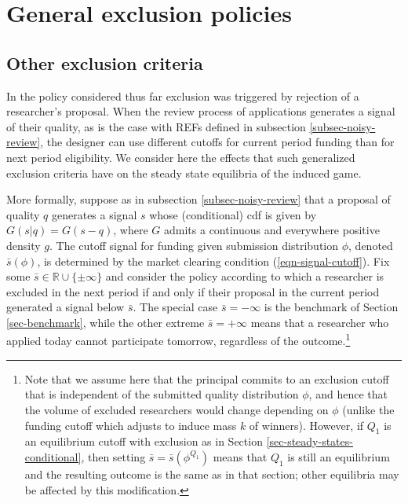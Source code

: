 \documentclass[12pt]{article}
\theoremstyle{plain}
\theoremstyle{definition}
\theoremstyle{remark}
\def\RR{\mathbb{R}}
\begin{document}
\section{General exclusion policies}\label{sec-generalized}


\subsection{Other exclusion criteria}\label{subsec-other-criteria}

In the policy considered thus far exclusion was triggered by rejection of a researcher's proposal. When the review process of applications generates a signal of their quality, as is the case with REFs defined in subsection \ref{subsec-noisy-review}, the designer can use different cutoffs for current period funding than for next period eligibility. We consider here the effects that such generalized exclusion criteria have on the steady state equilibria of the induced game.

More formally, suppose as in subsection \ref{subsec-noisy-review} that a proposal of quality $q$ generates a signal $s$ whose (conditional) cdf is given by $G(s|q)=G(s-q)$, where $G$ admits a continuous and everywhere positive density $g$. The cutoff signal for funding given submission distribution $\phi$, denoted $\bar s(\phi)$, is determined by the market clearing condition (\ref{eqn-signal-cutoff}). Fix some $\bar s\in \RR \cup \{\pm \infty\}$ and consider the policy according to which a researcher is excluded in the next period if and only if their proposal in the current period generated a signal below $\bar s$. The special case $\bar s = -\infty$ is the benchmark of Section \ref{sec-benchmark}, while the other extreme $\bar s=+\infty$ means that a researcher who applied today cannot participate tomorrow, regardless of the outcome.\footnote{Note that we assume here that the principal commits to an exclusion cutoff that is independent of the submitted quality distribution $\phi$, and hence that the volume of excluded researchers would change depending on $\phi$ (unlike the funding cutoff which adjusts to induce mass $k$ of winners). However, if $Q_1$ is an equilibrium cutoff with exclusion as in Section \ref{sec-steady-states-conditional}, then setting $\bar s = \bar s(\phi^{Q_1})$ means that $Q_1$ is still an equilibrium and the resulting outcome is the same as in that section; other equilibria may be affected by this modification.} 
\end{document}
